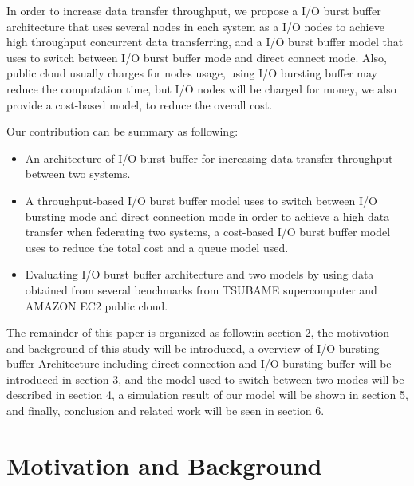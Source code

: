 \documentclass[JIP,draft]{ipsj}
\begin{document}
In order to increase data transfer throughput, we propose a I/O burst buffer architecture that uses several nodes in each system as a I/O nodes to achieve high throughput concurrent data transferring, and a I/O burst buffer model that uses to switch between I/O burst buffer mode and direct connect mode.
Also, public cloud usually charges for nodes usage, using I/O bursting buffer may reduce the computation time, but I/O nodes will be charged for money, we also provide a cost-based model, to reduce the overall cost.

Our contribution can be summary as following:
\begin{itemize}
	\item An architecture of I/O burst buffer for increasing data transfer throughput between two systems.
	\item A throughput-based I/O burst buffer model uses to switch between I/O bursting mode and direct connection mode in order to achieve a high data transfer when federating two systems, a cost-based I/O burst buffer model uses to reduce the total cost and a queue model used.
	\item Evaluating I/O burst buffer architecture and two models by using data obtained from several benchmarks from TSUBAME supercomputer and AMAZON EC2 public cloud.
\end{itemize}
The remainder of this paper is organized as follow:in section 2, the motivation and background of this study will be introduced, a overview of I/O bursting buffer Architecture including direct connection and I/O bursting buffer will be introduced in section 3, and the model used to switch between two modes will be described in section 4, a simulation result of our model %
will be shown in section 5, and finally, conclusion and related work will be seen in section 6.

\section{Motivation and Background}
\end{document}
